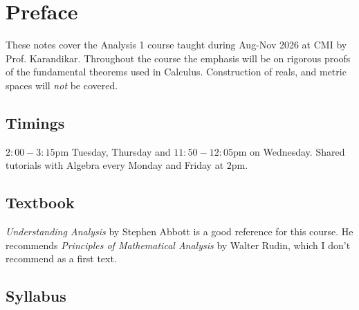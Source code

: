 \section*{Preface}

These notes cover the Analysis 1 course taught during Aug-Nov 2026 at CMI by Prof. Karandikar.
Throughout the course the emphasis will be on rigorous proofs of the fundamental theorems used in Calculus.
Construction of reals, and metric spaces will \emph{not} be covered.

\subsection{Timings}
$2:00-3:15$pm Tuesday, Thursday and $11:50-12:05$pm on Wednesday. Shared tutorials with Algebra every Monday and
Friday at $2$pm.

\subsection{Textbook}
\emph{Understanding Analysis} by Stephen Abbott is a good reference for this course. He recommends
\emph{Principles of Mathematical Analysis} by Walter Rudin, which I don't recommend as a first text.

\subsection{Syllabus}

